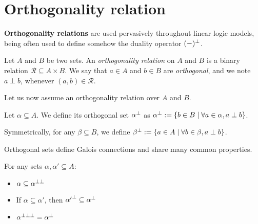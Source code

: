 \section{Orthogonality relation}\label{orthogonality-relation}

\textbf{Orthogonality relations} are used pervasively throughout linear
logic models, being often used to define somehow the duality operator
\((-)^\bot\).

\begin{definition}
Let $A$ and $B$ be two sets. An \emph{orthogonality relation} on $A$ and $B$ is a binary relation $\mathcal{R}\subseteq A\times B$. We say that $a\in A$ and $b\in B$ are \emph{orthogonal}, and we note $a\perp b$, whenever $(a, b)\in\mathcal{R}$.
\end{definition}

Let us now assume an orthogonality relation over \(A\) and \(B\).

\begin{definition}
Let $\alpha\subseteq A$. We define its orthogonal set $\alpha^\bot$ as $\alpha^\bot:=\{b\in B \mid \forall a\in \alpha, a\perp b\}$.

Symmetrically, for any $\beta\subseteq B$, we define $\beta^\bot:=\{a\in A \mid \forall b\in \beta, a\perp b\}$.
\end{definition}

Orthogonal sets define Galois connections and share many common
properties.

\begin{proposition}
For any sets $\alpha, \alpha'\subseteq A$:
\begin{itemize}
\item $\alpha\subseteq \alpha^{\bot\bot}$
\item If $\alpha\subseteq\alpha'$, then ${\alpha'}^\bot\subseteq\alpha^\bot$
\item $\alpha^{\bot\bot\bot} = \alpha^\bot$
\end{itemize}
\end{proposition}

